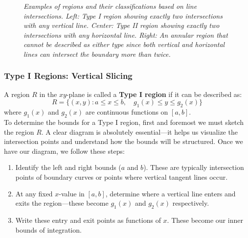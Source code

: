 \begin{figure}[H]
    \caption{\textit{Examples of regions and their classifications based on line intersections. Left: Type I region showing exactly two intersections with any vertical line. Center: Type II region showing exactly two intersections with any horizontal line. Right: An annular region that cannot be described as either type since both vertical and horizontal lines can intersect the boundary more than twice.}}
    \label{fig:region_types}
\end{figure}

\subsubsection*{Type I Regions: Vertical Slicing} 

\noindent A region $R$ in the $xy$-plane is called a \textbf{Type I region} if it can be described as:
\[
R = \{(x,y) : a \leq x \leq b, \quad g_1(x) \leq y \leq g_2(x)\}
\]
where $g_1(x)$ and $g_2(x)$ are continuous functions on $[a,b]$. \\

\noindent To determine the bounds for a Type I region, first and foremost we must sketch the region $R$. A clear diagram is absolutely essential—it helps us visualize the intersection points and understand how the bounds will be structured. Once we have our diagram, we follow these steps:

\begin{enumerate}
    \item Identify the left and right bounds ($a$ and $b$). These are typically intersection points of boundary curves or points where vertical tangent lines occur.
    
    \item At any fixed $x$-value in $[a,b]$, determine where a vertical line enters and exits the region—these become $g_1(x)$ and $g_2(x)$ respectively.
    
    \item Write these entry and exit points as functions of $x$. These become our inner bounds of integration.
\end{enumerate}

